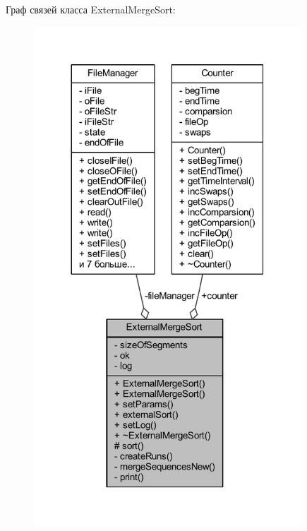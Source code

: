 Граф связей класса External\+Merge\+Sort\+:\nopagebreak
\begin{figure}[H]
\begin{center}
\leavevmode
\includegraphics[width=284pt]{class_external_merge_sort__coll__graph}
\end{center}
\end{figure}
